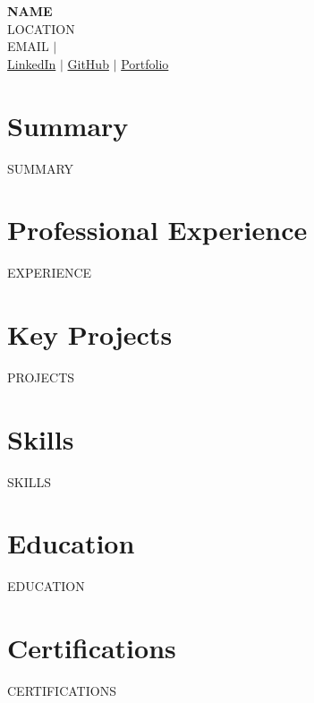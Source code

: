\documentclass[11pt,a4paper]{article}
\begin{document}
\begin{center}
    {\LARGE\bfseries {{NAME}}} \\[4pt]
    {{LOCATION}} \\[2pt]
    {{EMAIL}} \quad $\vert$  \\[2pt]
    \href{{{LINKEDIN}}}{LinkedIn} \quad $\vert$ \quad \href{{{GITHUB}}}{GitHub} \quad $\vert$ \quad \href{{{PORTFOLIO}}}{Portfolio}
\end{center}

\section{Summary}
{{SUMMARY}}

\section{Professional Experience}
{{EXPERIENCE}}

\section{Key Projects}
{{PROJECTS}}

\section{Skills}
{{SKILLS}}

\section{Education}
{{EDUCATION}}

\section{Certifications}
{{CERTIFICATIONS}}
\end{document}
